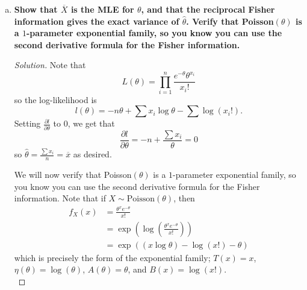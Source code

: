 \documentclass[11pt]{article}
\newenvironment{solution}
  {\renewcommand\qedsymbol{$\blacksquare$}\begin{proof}[Solution]}
  {\end{proof}}
\begin{document}
\begin{enumerate}
\begin{enumerate}[a)]
\begin{solution}
        Plugging in the respective probabilities, we get
        \begin{align*}
            P(X_1 = 2, X_2 = 3, X_3 = 0 \mid Y = 5) &= \frac{P(X_1 = 2)P(X_2 = 3)P(X_3 = 0)}{P(Y=5)} \\
            &= \frac{\frac{e^{-2}2^2}{2!} \frac{e^{-2}2^3}{3!} \frac{e^{-2}2^0}{0!}}{\frac{e^{-6} 6^5}{5!}} \\
            &= \boxed{\frac{10}{243}}.
        \end{align*}

        For $\theta = 3$, we use the same logic to get that
        \begin{align*}
            P(X_1 = 2, X_2 = 3, X_3 = 0 \mid Y = 5) &= \frac{P(X_1 = 2)P(X_2 = 3)P(X_3 = 0)}{P(Y=5)} \\
            &= \frac{\frac{e^{-3}3^2}{2!} \frac{e^{-3}3^3}{3!} \frac{e^{-3}3^0}{0!}}{\frac{e^{-9} 9^5}{5!}} \\
            &= \boxed{\frac{10}{243}}
        \end{align*}
        and so the probability does not change depending on the value of $\theta$.
        \end{solution}
        
        \item \textbf{Show that $\overline{X}$ is the MLE for $\theta$, and that the reciprocal Fisher information gives the exact variance of $\hat{\theta}$. 
        Verify that Poisson$(\theta)$ is a $1$-parameter exponential family, so you know you can use the second derivative formula for the Fisher information.}

        \begin{solution}
        Note that 
        \[
            L(\theta) = \prod_{i=1}^n \frac{e^{-\theta}\theta^{x_i}}{x_i!}
        \]
        so the log-likelihood is
        \[
            l(\theta) = -n\theta + \sum x_i \log \theta - \sum \log(x_i!).
        \]
        Setting $\frac{\partial l}{\partial \theta}$ to $0$, we get that
        \[
            \frac{\partial l}{\partial \theta} = -n + \frac{\sum x_i}{\theta} = 0
        \]
        so $\boxed{\hat{\theta} = \frac{\sum x_i}{n} = \overline{x}}$ as desired.  

        \hrulefill

        We will now verify that Poisson$(\theta)$ is a $1$-parameter exponential family, so you know you can use the second derivative formula for the Fisher information. Note that
        if $X \sim \mathrm{Poisson}(\theta)$, then
        \begin{align*}
            f_{X}(x) &= \frac{\theta^x e^{-\theta}}{x!} \\
            &= \exp \left( \log \left( \frac{\theta^x e^{-\theta}}{x!} \right)  \right) \\
            &= \exp ((x \log \theta) - \log(x!) - \theta)
        \end{align*}
        which is precisely the form of the exponential family; $T(x) = x$, $\eta(\theta) = \log(\theta)$, $A(\theta) = \theta$, and $B(x) = \log(x!)$. \\


\end{solution}
\end{enumerate}
\end{enumerate}
\end{document}
